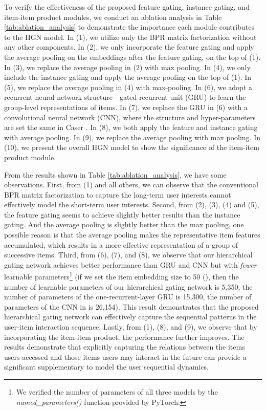 \documentclass[sigconf]{acmart}
\begin{document}
To verify the effectiveness of the proposed feature gating, instance gating, and item-item product modules, we conduct an ablation analysis in Table \ref{tab:ablation_analysis} to demonstrate the importance each module contributes to the HGN model. In (1), we utilize only the BPR matrix factorization without any other components. In (2), we only incorporate the feature gating and apply the average pooling on the embeddings after the feature gating, on the top of (1). In (3), we replace the average pooling in (2) with max pooling. In (4), we only include the instance gating and apply the average pooling on the top of (1). In (5), we replace the average pooling in (4) with max-pooling. In (6), we adopt a recurrent neural network structure---gated recurrent unit (GRU) \cite{DBLP:conf/emnlp/ChoMGBBSB14} to learn the group-level representations of items. In (7), we replace the GRU in (6) with a convolutional neural network (CNN), where the structure and hyper-parameters are set the same in Caser \cite{DBLP:conf/wsdm/TangW18}. In (8), we both apply the feature and instance gating with average pooling. In (9), we replace the average pooling with max pooling. In (10), we present the overall HGN model to show the significance of the item-item product module.

From the results shown in Table \ref{tab:ablation_analysis}, we have some observations. First, from (1) and all others, we can observe that the conventional BPR matrix factorization to capture the long-term user interests cannot effectively model the short-term user interests. Second, from (2), (3), (4) and (5), the feature gating seems to achieve slightly better results than the instance gating. And the average pooling is slightly better than the max pooling, one possible reason is that the average pooling makes the representative item features accumulated, which results in a more effective representation of a group of  successive items. Third, from (6), (7), and (8), we observe that our hierarchical gating network achieves better performance than GRU and CNN but with \textit{fewer} learnable parameters\footnote{We verified the number of parameters of all three models by the \textit{named\_parameters()} function provided by PyTorch.} (if we set the item embedding size to 50 (), then the number of learnable parameters of our hierarchical gating network is 5,350, the number of parameters of the one-recurrent-layer GRU is 15,300, the number of parameters of the CNN in \cite{DBLP:conf/wsdm/TangW18} is 26,154). This result demonstrates that the proposed hierarchical gating network can effectively capture the sequential patterns in the user-item interaction sequence. Lastly, from (1), (8), and (9), we observe that by incorporating the item-item product, the performance further improves. The results demonstrate that explicitly capturing the relations between the items users accessed and those items users may interact in the future can provide a significant supplementary to model the user sequential dynamics.
\end{document}
